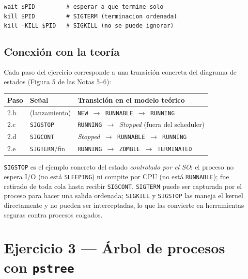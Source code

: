\documentclass[11pt,a4paper]{article}
\begin{document}
\begin{lstlisting}
wait $PID         # esperar a que termine solo
kill $PID         # SIGTERM (terminacion ordenada)
kill -KILL $PID   # SIGKILL (no se puede ignorar)
\end{lstlisting}

\subsection*{Conexión con la teoría}

Cada paso del ejercicio corresponde a una transición concreta del
diagrama de estados (Figura 5 de las Notas 5--6):

\begin{center}
\small
\begin{tabular}{@{}llp{8.0cm}@{}}
\toprule
Paso & Señal & Transición en el modelo teórico \\
\midrule
2.b & (lanzamiento) & \texttt{NEW}~$\rightarrow$~\texttt{RUNNABLE}~$\rightarrow$~\texttt{RUNNING} \\
2.c & \texttt{SIGSTOP} & \texttt{RUNNING}~$\rightarrow$~\emph{Stopped} (fuera del scheduler) \\
2.d & \texttt{SIGCONT} & \emph{Stopped}~$\rightarrow$~\texttt{RUNNABLE}~$\rightarrow$~\texttt{RUNNING} \\
2.e & \texttt{SIGTERM}/fin & \texttt{RUNNING}~$\rightarrow$~\texttt{ZOMBIE}~$\rightarrow$~\texttt{TERMINATED} \\
\bottomrule
\end{tabular}
\end{center}

\texttt{SIGSTOP} es el ejemplo concreto del estado \emph{controlado por
el SO}: el proceso no espera I/O (no está \texttt{SLEEPING}) ni compite
por CPU (no está \texttt{RUNNABLE}); fue retirado de toda cola hasta
recibir \texttt{SIGCONT}. \texttt{SIGTERM} puede ser capturada por el
proceso para hacer una salida ordenada; \texttt{SIGKILL} y \texttt{SIGSTOP}
las maneja el kernel directamente y no pueden ser interceptadas, lo
que las convierte en herramientas seguras contra procesos colgados.

\section{Ejercicio 3 --- Árbol de procesos con \texttt{pstree}}
\end{document}
